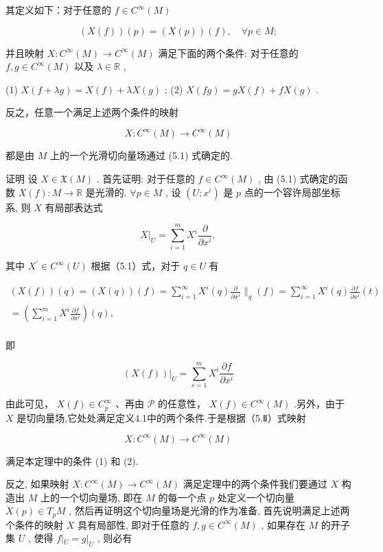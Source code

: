 其定义如下：对于任意的  $f \in C^{\infty}(M)$

$$
(X (f)) (p) = (X (p)) (f), \quad \forall p \in M;%
$$

并且映射  $X: C^{\infty}(M) \to C^{\infty}(M)$  满足下面的两个条件: 对于任意的  $f, g \in C^{\infty}(M)$  以及  $\lambda \in \mathbb{R}$ ,

(1)  $X(f + \lambda g) = X(f) + \lambda X(g)$ ;  
(2)  $X(fg) = gX(f) + fX(g)$ .

反之，任意一个满足上述两个条件的映射

$$
X: C ^ {\infty} (M) \to C ^ {\infty} (M)
$$

都是由  $M$  上的一个光滑切向量场通过 (5.1) 式确定的.

证明 设  $X \in \mathfrak{X}(M)$ . 首先证明: 对于任意的  $f \in C^{\infty}(M)$ , 由 (5.1) 式确定的函数  $X(f): M \to \mathbb{R}$  是光滑的.  $\forall p \in M$ , 设  $(U; x^{i})$  是  $p$  点的一个容许局部坐标系, 则  $X$  有局部表达式

$$
X | _ {U} = \sum_ {i = 1} ^ {m} X ^ {i} \frac {\partial}{\partial x ^ {i}},
$$

其中  $X^{\prime}\in C^{\infty}(U)$  根据（5.1）式，对于  $q\in U$  有

$$
\begin{array}{l} (X (f)) (q) = (X (q)) (f) = \sum_ {i = 1} ^ {\infty} X ^ {i} (q) \frac {\partial}{\partial x ^ {i}} \Bigg \| _ {q} (f) = \sum_ {i = 1} ^ {\infty} X ^ {i} (q) \frac {\partial f}{\partial x ^ {i}} (t) \\ = \left(\sum_ {i = 1} ^ {m} X ^ {i} \frac {\partial f}{\partial x ^ {i}}\right) (q), \\ \end{array}
$$

即

$$
\left. (X (f)) \right| _ {U} = \sum_ {s = 1} ^ {m} X ^ {i} \frac {\partial f}{\partial x ^ {i}}
$$

由此可见，  $X(f)\in C_{p}^{\infty}$  、再由  $\mathcal{P}$  的任意性，  $X(f)\in C^{\infty}(M)$  .另外，由于 $X$  是切向量场,它处处满足定义4.1中的两个条件.于是根据（5.Ⅱ）式映射

$$
X: C ^ {\infty} (M) \to C ^ {\infty} (M)
$$

满足本定理中的条件 (1) 和 (2).

反之, 如果映射  $X: C^{\infty}(M) \to C^{\infty}(M)$  满足定理中的两个条件我们要通过  $X$  构造出  $M$  上的一个切向量场, 即在  $M$  的每一个点  $p$  处定义一个切向量  $\dot{X}(p) \in T_pM$ , 然后再证明这个切向量场是光滑的作为准备, 首先说明满足上述两个条件的映射  $X$  具有局部性, 即对于任意的  $f, g \in C^{\infty}(M)$ , 如果存在  $M$  的开子集  $U$ , 使得  $f|_U = g|_U$ , 则必有

